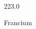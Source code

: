 \documentclass[12pt]{article}
\begin{document}
\hfill{}
\vfill
\begin{center}
  {\fontsize{50}{60}
  }

  223.0

Francium
\end{center}
\vfill
\end{document}
